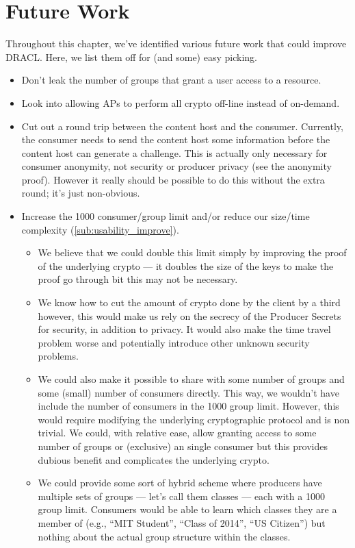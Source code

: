 \documentclass[pdftex,12pt,a4papaer,twoside,notitlepage]{report}
\begin{document}
\section{Future Work}

Throughout this chapter, we've identified various future work that could improve
DRACL. Here, we list them off for (and some) easy picking.

\begin{itemize}
\item Don't leak the number of groups that grant a user access to a resource.
\item Look into allowing APs to perform all crypto off-line instead of
  on-demand.
\item Cut out a round trip between the content host and the consumer. Currently,
  the consumer needs to send the content host some information before the
  content host can generate a challenge. This is actually only necessary for
  consumer anonymity, not security or producer privacy (see the anonymity
  proof). However it really should be possible to do this without the extra
  round; it's just non-obvious.
\item Increase the 1000 consumer/group limit and/or reduce our size/time complexity (\cref{sub:usability_improve}).
  \begin{itemize} 
  \item We believe that we could double this limit simply by improving the proof
    of the underlying crypto --- it doubles the size of the keys to make the
    proof go through bit this may not be necessary.
  \item We know how to cut the amount of crypto done by the client by a third
    however, this would make us rely on the secrecy of the Producer Secrets for
    security, in addition to privacy. It would also make the time travel problem
    worse and potentially introduce other unknown security problems.
  \item We could also make it possible to share with some number of groups and
    some (small) number of consumers directly. This way, we wouldn't have
    include the number of consumers in the 1000 group limit. However, this would
    require modifying the underlying cryptographic protocol and is non trivial.
    We could, with relative ease, allow granting access to some number of groups
    or (exclusive) an single consumer but this provides dubious benefit and
    complicates the underlying crypto.
  \item We could provide some sort of hybrid scheme where producers have
    multiple sets of groups --- let's call them classes --- each with a 1000
    group limit. Consumers would be able to learn which classes they are a
    member of (e.g., ``MIT Student'', ``Class of 2014'', ``US Citizen'') but
    nothing about the actual group structure within the classes.
  \end{itemize}
\end{itemize}
\end{document}
